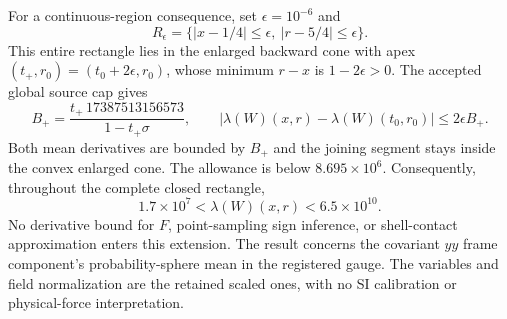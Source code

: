 For a continuous-region consequence, set $\epsilon=10^{-6}$ and
\[
 R_\epsilon=\{|x-1/4|\le\epsilon,\ |r-5/4|\le\epsilon\}.
\]
This entire rectangle lies in the enlarged backward cone with apex
$(t_+,r_0)=(t_0+2\epsilon,r_0)$, whose minimum $r-x$ is
$1-2\epsilon>0$. The accepted global source cap gives
\[
 B_+=\frac{t_+\,17387513156573}{1-t_+\sigma},\qquad
 |\lambda(W)(x,r)-\lambda(W)(t_0,r_0)|\le2\epsilon B_+.
\]
Both mean derivatives are bounded by $B_+$ and the joining segment stays
inside the convex enlarged cone. The allowance is below $8.695\times10^6$.
Consequently, throughout the complete closed rectangle,
\begin{equation}
 \boxed{\quad1.7\times10^7<\lambda(W)(x,r)<6.5\times10^{10}.
 \quad}                                                    \label{eq:rectangle}
\end{equation}
No derivative bound for $F$, point-sampling sign inference, or shell-contact
approximation enters this extension. The result concerns the covariant $yy$
frame component's probability-sphere mean in the registered gauge. The
variables and field normalization are the retained scaled ones, with no SI
calibration or physical-force interpretation.
